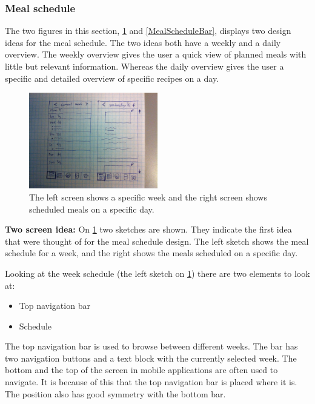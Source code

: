 \subsubsection{Meal schedule} \label{MealScheduleSketches}
The two figures in this section, \cref{MealScheduleList} and \cref{MealScheduleBar}, displays two design ideas for the meal schedule. The two ideas both have a weekly and a daily overview. The weekly overview gives the user a quick view of planned meals with little but relevant information. Whereas the daily overview gives the user a specific and detailed overview of specific recipes on a day.

\begin{figure}[H]
	\centering
    \includegraphics[width=0.5\textwidth]{Grafik/FoodPlanner/FinalMealScheduleSketch1}
	\caption{The left screen shows a specific week and the right screen shows scheduled meals on a specific day.}
	\label{MealScheduleList}
\end{figure}

\textbf{Two screen idea:} On \cref{MealScheduleList} two sketches are shown. They indicate the first idea that were thought of for the meal schedule design. The left sketch shows the meal schedule for a week, and the right shows the meals scheduled on a specific day.

Looking at the week schedule (the left sketch on \cref{MealScheduleList}) there are two elements to look at:

\begin{itemize}
    \item Top navigation bar
    \item Schedule
\end{itemize}

The top navigation bar is used to browse between different weeks. The bar has two navigation buttons and a text block with the currently selected week. The bottom and the top of the screen in mobile applications are often used to navigate. It is because of this that the top navigation bar is placed where it is. The position also has good symmetry with the bottom bar.

